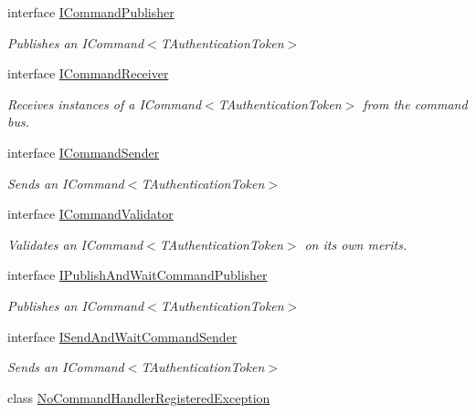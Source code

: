 \begin{DoxyCompactItemize}
interface \hyperlink{interfaceCqrs_1_1Commands_1_1ICommandPublisher}{I\+Command\+Publisher}
\begin{DoxyCompactList}\small\item\em Publishes an I\+Command$<$\+T\+Authentication\+Token$>$ \end{DoxyCompactList}\item 
interface \hyperlink{interfaceCqrs_1_1Commands_1_1ICommandReceiver}{I\+Command\+Receiver}
\begin{DoxyCompactList}\small\item\em Receives instances of a I\+Command$<$\+T\+Authentication\+Token$>$ from the command bus. \end{DoxyCompactList}\item 
interface \hyperlink{interfaceCqrs_1_1Commands_1_1ICommandSender}{I\+Command\+Sender}
\begin{DoxyCompactList}\small\item\em Sends an I\+Command$<$\+T\+Authentication\+Token$>$ \end{DoxyCompactList}\item 
interface \hyperlink{interfaceCqrs_1_1Commands_1_1ICommandValidator}{I\+Command\+Validator}
\begin{DoxyCompactList}\small\item\em Validates an I\+Command$<$\+T\+Authentication\+Token$>$ on its own merits. \end{DoxyCompactList}\item 
interface \hyperlink{interfaceCqrs_1_1Commands_1_1IPublishAndWaitCommandPublisher}{I\+Publish\+And\+Wait\+Command\+Publisher}
\begin{DoxyCompactList}\small\item\em Publishes an I\+Command$<$\+T\+Authentication\+Token$>$ \end{DoxyCompactList}\item 
interface \hyperlink{interfaceCqrs_1_1Commands_1_1ISendAndWaitCommandSender}{I\+Send\+And\+Wait\+Command\+Sender}
\begin{DoxyCompactList}\small\item\em Sends an I\+Command$<$\+T\+Authentication\+Token$>$ \end{DoxyCompactList}\item 
class \hyperlink{classCqrs_1_1Commands_1_1NoCommandHandlerRegisteredException}{No\+Command\+Handler\+Registered\+Exception}
\end{DoxyCompactItemize}
